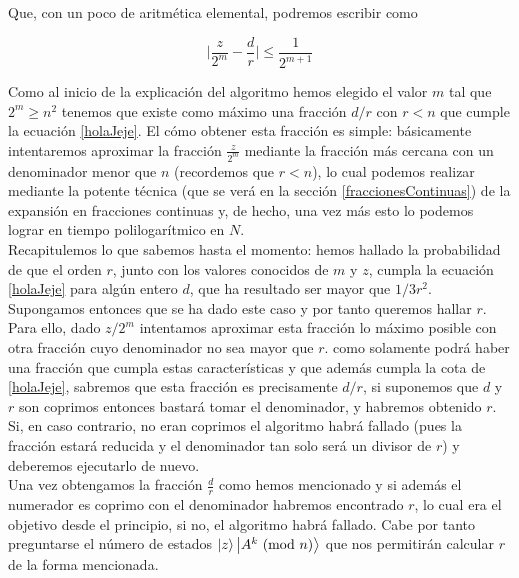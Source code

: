 \documentclass[11pt, spanish]{report}
\numberwithin{equation}{section}
\numberwithin{defin}{section}
\begin{document}
Que, con un poco de aritmética elemental, podremos escribir como

\begin{equation}\label{holaJeje}
\Big|\frac{z}{2^m}-\frac{d}{r}\Big|\leq\frac{1}{2^{m+1}}
\end{equation}

Como al inicio de la explicación del algoritmo hemos elegido el valor $m$ tal que $2^m\geq n^2$ tenemos que existe como máximo una fracción $d/r$ con $r<n$ que cumple la ecuación \ref{holaJeje}. El cómo obtener esta fracción es simple: básicamente intentaremos aproximar la fracción $\frac{z}{2^m}$ mediante la fracción más cercana con un denominador menor que $n$ (recordemos que $r<n$), lo cual podemos realizar mediante la potente técnica (que se verá en la sección \ref{fraccionesContinuas}) de la expansión en fracciones continuas y, de hecho, una vez más esto lo podemos lograr en tiempo polilogarítmico en $N$.\\

Recapitulemos lo que sabemos hasta el momento: hemos hallado la probabilidad de que el orden $r$, junto con los valores conocidos de $m$ y $z$, cumpla la ecuación \ref{holaJeje} para algún entero $d$, que ha resultado ser mayor que $1/3r^2$. Supongamos entonces que se ha dado este caso y por tanto queremos hallar $r$. Para ello, dado $z/2^m$ intentamos aproximar esta fracción lo máximo posible con otra fracción cuyo denominador no sea mayor que $r$.  como solamente podrá haber una fracción que cumpla estas características y que además cumpla la cota de \ref{holaJeje}, sabremos que esta fracción es precisamente $d/r$, si suponemos que $d$ y $r$ son coprimos entonces bastará tomar el denominador, y habremos obtenido $r$. Si, en caso contrario, no eran coprimos el algoritmo habrá fallado (pues la fracción estará reducida y el denominador tan solo será un divisor de $r$) y deberemos ejecutarlo de nuevo.\\

Una vez obtengamos la fracción $\frac{d}{r}$ como hemos mencionado y si además el numerador es coprimo con el denominador habremos encontrado $r$, lo cual era el objetivo desde el principio, si no, el algoritmo habrá fallado. Cabe por tanto preguntarse el número de estados $\ket{z}\ket{A^k\ \text{(mod }n)}$ que nos permitirán calcular $r$ de la forma mencionada.\\
\end{document}
